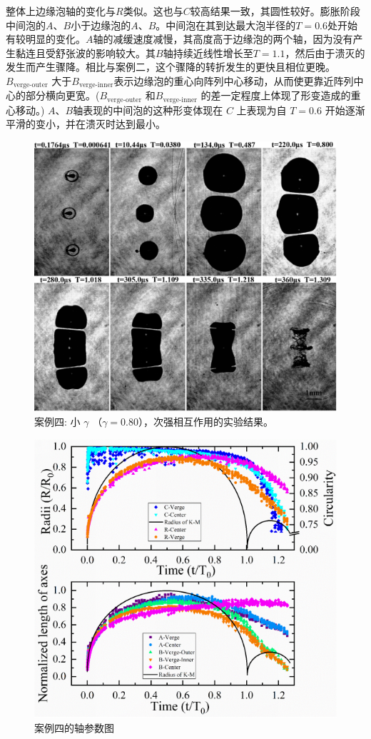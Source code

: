 整体上边缘泡轴的变化与$R$类似。这也与$C$较高结果一致，其圆性较好。膨胀阶段中间泡的$A$、$B$小于边缘泡的$A$、$B$。中间泡在其到达最大泡半径的$T=0.6$处开始有较明显的变化。$A$轴的减缓速度减慢，其高度高于边缘泡的两个轴，因为没有产生黏连且受舒张波的影响较大。其$B$轴持续近线性增长至$T=1.1$，然后由于溃灭的发生而产生骤降。相比与案例二，这个骤降的转折发生的更快且相位更晚。$B_\text{verge-outer}$
大于$B_\text{verge-inner}$表示边缘泡的重心向阵列中心移动，从而使更靠近阵列中心的部分横向更宽。($B_\text{verge-outer}$
和$B_\text{verge-inner}$ 的差一定程度上体现了形变造成的重心移动。)
$A$、$B$轴表现的中间泡的这种形变体现在 $C$ 上表现为自 $T=0.6$
开始逐渐平滑的变小，并在溃灭时达到最小。

\begin{figure}[H]
    \centering
    \includegraphics[width=0.7\linewidth]{img/fig4.9.png}
    \caption{案例四: 小 $\gamma$
（$\gamma=0.80$），次强相互作用的实验结果。}
    \label{fig:4.9}
\end{figure}


\begin{figure}[H]
    \centering
    \includegraphics[width=0.7\linewidth]{img/fig4.10.png}
    \caption{案例四的轴参数图}
    \label{fig:4.10}
\end{figure}


